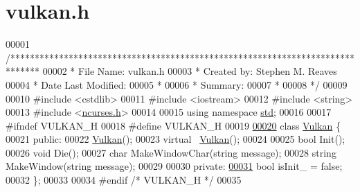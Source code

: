 \hypertarget{vulkan_8h_source}{}\section{vulkan.\+h}

\begin{DoxyCode}
00001 \textcolor{comment}{/******************************************************************************}
00002 \textcolor{comment}{ * File Name: vulkan.h}
00003 \textcolor{comment}{ * Created by: Stephen M. Reaves}
00004 \textcolor{comment}{ * Date Last Modified:}
00005 \textcolor{comment}{ *}
00006 \textcolor{comment}{ * Summary:}
00007 \textcolor{comment}{ *}
00008 \textcolor{comment}{ */}
00009 
00010 \textcolor{preprocessor}{#include <cstdlib>}
00011 \textcolor{preprocessor}{#include <iostream>}
00012 \textcolor{preprocessor}{#include <string>}
00013 \textcolor{preprocessor}{#include <\mbox{\hyperlink{ncurses_8h}{ncurses.h}}>}
00014 
00015 \textcolor{keyword}{using namespace }\mbox{\hyperlink{namespacestd}{std}};
00016 
00017 \textcolor{preprocessor}{#ifndef VULKAN\_H}
00018 \textcolor{preprocessor}{#define VULKAN\_H}
00019 
\mbox{\hyperlink{classVulkan}{00020}} \textcolor{keyword}{class }\mbox{\hyperlink{classVulkan}{Vulkan}} \{
00021   \textcolor{keyword}{public}:
00022     \mbox{\hyperlink{classVulkan}{Vulkan}}();
00023     \textcolor{keyword}{virtual} ~\mbox{\hyperlink{classVulkan}{Vulkan}}();
00024 
00025     \textcolor{keywordtype}{bool} Init();
00026     \textcolor{keywordtype}{void} Die();
00027     \textcolor{keywordtype}{char} MakeWindowChar(\textcolor{keywordtype}{string} message);
00028     \textcolor{keywordtype}{string} MakeWindow(\textcolor{keywordtype}{string} message);
00029 
00030   \textcolor{keyword}{private}:
\mbox{\hyperlink{classVulkan_aa19833e837744cc2f6b1f93c1d66a693}{00031}}     \textcolor{keywordtype}{bool} isInit\_ = \textcolor{keyword}{false};
00032 \};
00033 
00034 \textcolor{preprocessor}{#endif }\textcolor{comment}{/* VULKAN\_H */}\textcolor{preprocessor}{}
00035 
\end{DoxyCode}

